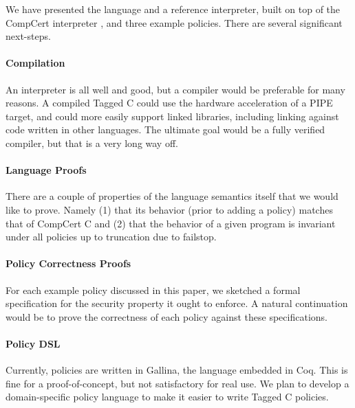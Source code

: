 \documentclass{llncs}
\begin{document}
We have presented the language and a reference interpreter, built on top of the CompCert interpreter
\cite{Leroy09:CompCert}, and three example policies. There are several significant next-steps.

\paragraph{Compilation}

An interpreter is all well and good, but a compiler would be preferable for many reasons.
A compiled Tagged C could use the hardware acceleration of a PIPE target, and could more easily
support linked libraries, including linking against code written in other languages.
The ultimate goal would be a fully verified compiler, but that is a very long way off.


\paragraph{Language Proofs}

There are a couple of properties of the language semantics itself that we would like to prove.
Namely (1) that its behavior (prior to adding a policy) matches that of CompCert C and
(2) that the behavior of a given program is invariant under all policies up to truncation due
to failstop.

\paragraph{Policy Correctness Proofs}

For each example policy discussed in this paper, we sketched a formal specification for the
security property it ought to enforce. A natural continuation would be to prove the correctness
of each policy against these specifications.

\paragraph{Policy DSL}

Currently, policies are written in Gallina, the language embedded in Coq. This is fine for a
proof-of-concept, but not satisfactory for real use. We plan to develop a domain-specific policy
language to make it easier to write Tagged C policies.




\appendix
\end{document}
